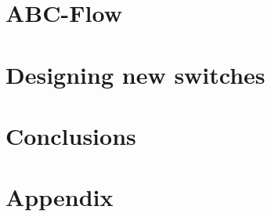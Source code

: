 \documentclass[]{phdthesis}
\begin{document}
\mainmatter*
\chapter{ABC-Flow}


\mainmatter*
\chapter{Designing new switches}


\mainmatter*
\chapter{Conclusions}


\printbibliography

\appendix*
\chapter{Appendix}

\end{document}
